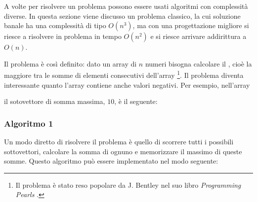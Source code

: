
A volte per risolvere un problema
possono essere usati algoritmi
con complessità diverse.
In questa sezione viene discusso un problema classico,
la cui soluzione banale ha una complessità di tipo $O(n^3)$,
ma con una progettazione migliore si riesce a risolvere in problema
in tempo $O(n^2)$ e si riesce arrivare addirittura a $O(n)$.

Il problema è così definito: dato un array di 
$n$ numeri bisogna calcolare il ,
cioè la maggiore tra le somme di elementi consecutivi dell'array
\footnote{Il problema è stato reso popolare da J. Bentley nel suo libro
\emph{Programming Pearls} \cite{ben86}.}.
Il problema diventa interessante quanto l'array contiene 
anche valori negativi.
Per esempio, nell'array
\begin{center}
\end{center}
\begin{samepage}
il sotovettore di somma massima, $10$, è il seguente:
\begin{center}
\end{center}
\end{samepage}

\subsubsection{Algoritmo 1}

Un modo diretto di risolvere il problema 
è quello di scorrere tutti i possibili
sottovettori, calcolare la somma di ognuno e memorizzare
il massimo di queste somme.
Questo algoritmo può essere implementato nel modo seguente:

